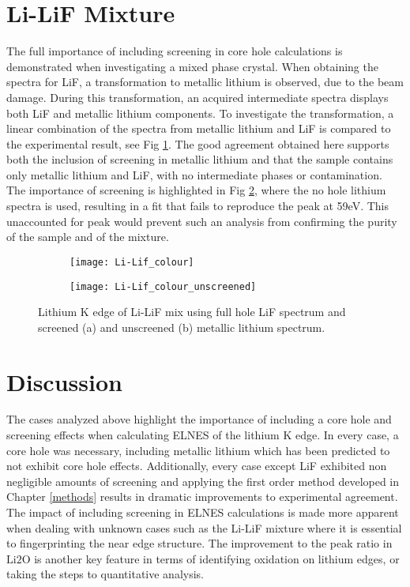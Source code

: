 \section{Li-LiF Mixture}
The full importance of including screening in core hole calculations is demonstrated when investigating a mixed phase crystal.  When obtaining the spectra for LiF, a transformation to metallic lithium is observed, due to the beam damage.   During this transformation, an acquired intermediate spectra displays both LiF and metallic lithium components.  To investigate the transformation, a linear combination of the spectra from metallic lithium and LiF is compared to the experimental result, see Fig \ref{mix-screened}.  The good agreement obtained here supports both the inclusion of screening in metallic lithium and that the sample contains only metallic lithium and LiF, with no intermediate phases or contamination.  The importance of screening is highlighted in Fig \ref{mix-unscreened}, where the no hole lithium spectra is used, resulting in a  fit that fails to reproduce the peak at 59eV.  This unaccounted for peak would prevent such an  analysis from confirming the purity of the sample and of the mixture.  



\begin{figure}
	\centering
	\begin{subfigure}{0.45\textwidth}
		
		\texttt{[image: Li-Lif\_colour]}
		\caption{}
		\label{mix-screened}
	\end{subfigure}
\hspace{-0.01cm}
	\begin{subfigure}{0.45\textwidth}
		\texttt{[image: Li-Lif\_colour\_unscreened]}
		\caption{}
		\label{mix-unscreened}
	\end{subfigure}
	\caption{Lithium K edge of Li-LiF mix using full hole LiF spectrum and screened (a) and unscreened (b) metallic lithium spectrum. }

\label{Li-LiF_mix_screened}
\end{figure}



\section{Discussion}
The  cases analyzed above highlight the importance of including a core hole and screening effects when calculating ELNES of the lithium K edge.  In every case, a core hole was necessary, including metallic lithium which has been predicted to not exhibit core hole effects.  Additionally, every case except LiF exhibited non negligible amounts of screening  and applying the first order method developed in Chapter \ref{methods} results in dramatic improvements to experimental agreement.  The impact of including screening in ELNES calculations is made more apparent when dealing with unknown cases such as the Li-LiF mixture where it is essential to fingerprinting the near edge structure.  The improvement to the peak ratio in $ \mathrm{Li2O} $ is another key feature in terms of identifying oxidation on lithium edges, or taking the steps to quantitative analysis.  \\

